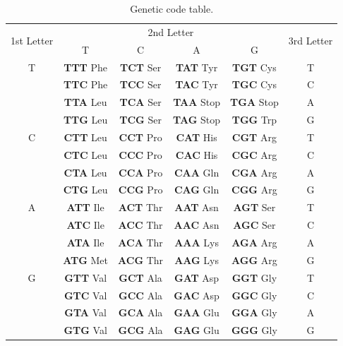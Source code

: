 \begin{table}[!ht]
    \centering
    \small
    \begin{tabular}{|c|c|c|c|c|c|}
    \hline
    \multirow{2}{*}{1st Letter} & \multicolumn{4}{c|}{2nd Letter} & \multirow{2}{*}{3rd Letter} \\ \cline{2-5}
     & T & C & A & G &  \\ \hline
    T & \textbf{TTT} Phe & \textbf{TCT} Ser & \textbf{TAT} Tyr & \textbf{TGT} Cys & T \\
      & \textbf{TTC} Phe & \textbf{TCC} Ser & \textbf{TAC} Tyr & \textbf{TGC} Cys & C \\
      & \textbf{TTA} Leu & \textbf{TCA} Ser & \textbf{TAA} Stop & \textbf{TGA} Stop & A \\
      & \textbf{TTG} Leu & \textbf{TCG} Ser & \textbf{TAG} Stop & \textbf{TGG} Trp & G \\ \hline
    C & \textbf{CTT} Leu & \textbf{CCT} Pro & \textbf{CAT} His & \textbf{CGT} Arg & T \\
      & \textbf{CTC} Leu & \textbf{CCC} Pro & \textbf{CAC} His & \textbf{CGC} Arg & C \\
      & \textbf{CTA} Leu & \textbf{CCA} Pro & \textbf{CAA} Gln & \textbf{CGA} Arg & A \\
      & \textbf{CTG} Leu & \textbf{CCG} Pro & \textbf{CAG} Gln & \textbf{CGG} Arg & G \\ \hline
    A & \textbf{ATT} Ile & \textbf{ACT} Thr & \textbf{AAT} Asn & \textbf{AGT} Ser & T \\
      & \textbf{ATC} Ile & \textbf{ACC} Thr & \textbf{AAC} Asn & \textbf{AGC} Ser & C \\
      & \textbf{ATA} Ile & \textbf{ACA} Thr & \textbf{AAA} Lys & \textbf{AGA} Arg & A \\
      & \textbf{ATG} Met & \textbf{ACG} Thr & \textbf{AAG} Lys & \textbf{AGG} Arg & G \\ \hline
    G & \textbf{GTT} Val & \textbf{GCT} Ala & \textbf{GAT} Asp & \textbf{GGT} Gly & T \\
      & \textbf{GTC} Val & \textbf{GCC} Ala & \textbf{GAC} Asp & \textbf{GGC} Gly & C \\
      & \textbf{GTA} Val & \textbf{GCA} Ala & \textbf{GAA} Glu & \textbf{GGA} Gly & A \\
      & \textbf{GTG} Val & \textbf{GCG} Ala & \textbf{GAG} Glu & \textbf{GGG} Gly & G \\ \hline
    \end{tabular}
    \caption{Genetic code table.}
    \end{table}

